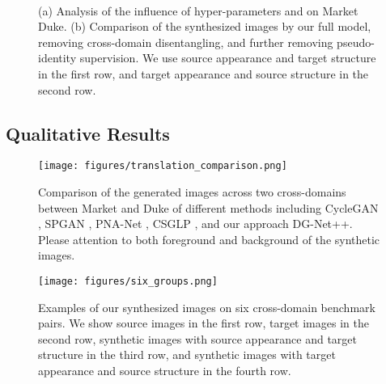 \documentclass[runningheads]{llncs}
\begin{document}
\begin{figure}
\centering     {}~~
\vspace{-.35cm}
\caption{(a) Analysis of the influence of hyper-parameters  and  on Market  Duke. (b) Comparison of the synthesized images by our full model, removing cross-domain disentangling, and further removing pseudo-identity supervision. We use source appearance and target structure in the first row, and target appearance and source structure in the second row.}
\vspace{-10pt}
\end{figure}




\subsection{Qualitative Results}

\begin{figure*}[!t]
	\centering
    \texttt{[image: figures/translation\_comparison.png]}
    \caption{Comparison of the generated images across two cross-domains between Market and Duke of different methods including CycleGAN \cite{zhu2017unpaired}, SPGAN \cite{deng2018image}, PNA-Net \cite{li2019cross}, CSGLP \cite{ren2019domain}, and our approach DG-Net++.  Please attention to both foreground and background of the synthetic images.}
    \vspace{-10pt}
    \label{fig:translation}
\end{figure*}

\begin{figure*}[!h]
	\centering
	\texttt{[image: figures/six\_groups.png]}
\caption{Examples of our synthesized images on six cross-domain benchmark pairs. We  show source images in the first row, target images in the second row, synthetic images with source appearance and target structure in the third row, and synthetic images with target appearance and source structure in the fourth row.}
    \vspace{-4pt}
	\label{fig:six_groups}
\end{figure*}
\end{document}
